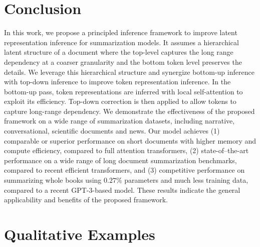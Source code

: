 \section{Conclusion}
In this work, we propose a principled inference framework to improve latent representation inference for summarization models. It assumes a hierarchical latent structure of a document where the top-level captures the long range dependency at a coarser granularity and the bottom token level preserves the details. We leverage this hierarchical structure and synergize bottom-up inference with top-down inference to improve token representation inference. In the bottom-up pass, token representations are inferred with local self-attention to exploit its efficiency. Top-down correction is then applied to allow tokens to capture long-range dependency. We demonstrate the effectiveness of the proposed framework on a wide range of summarization datasets, including narrative, conversational, scientific documents and news. Our model achieves (1) comparable or superior performance on short documents with higher memory and compute efficiency, compared to full attention transformers, (2) state-of--the-art performance on a wide range of long document summarization benchmarks, compared to recent efficient transformers, and (3) competitive performance on summarizing whole books using $0.27\%$ parameters and much less training data, compared to a recent GPT-3-based model. These results indicate the general applicability and benefits of the proposed framework. 

\clearpage
\appendix
\section{Qualitative Examples}

